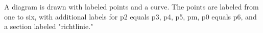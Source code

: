 A diagram is drawn with labeled points and a curve. The points are labeled from one to six, with additional labels for p2 equals p3, p4, p5, pm, p0 equals p6, and a section labeled "richtlinie."